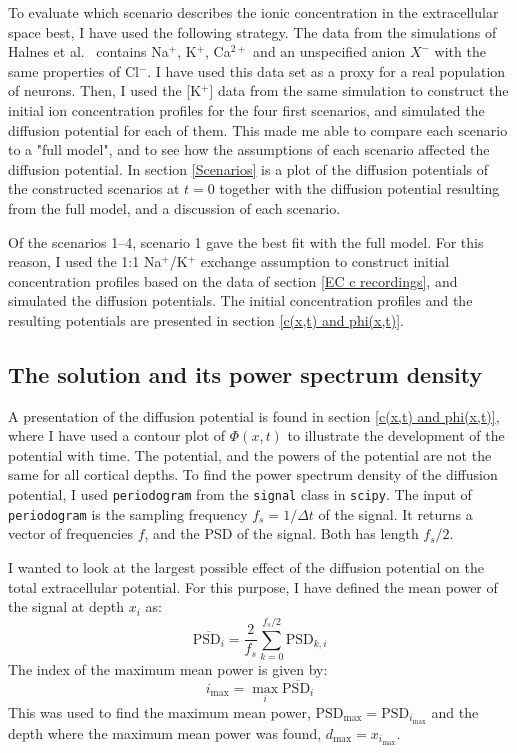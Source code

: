 \documentclass{article}
\begin{document}
To evaluate which scenario describes the ionic concentration in the extracellular space best, I have used the following strategy. 
The data from the  simulations of Halnes et al.\ \cite{Halnes2016} contains Na$^+$, K$^+$, Ca$^{2+}$ and an unspecified anion $X^-$ with the same properties of Cl$^-$. I have used this data set as a proxy for a real population of neurons. Then, I used the [K$^+$] data from the same simulation to construct the initial ion concentration profiles for the four first scenarios, and simulated the diffusion potential for each of them. This made me able to compare each scenario to a "full model", and to see how the assumptions of each scenario affected the diffusion potential. In section \ref{Scenarios} is a plot of the diffusion potentials of the constructed scenarios at $t=0$ together with the diffusion potential resulting from the full model, and a discussion of each scenario. 

Of the scenarios 1--4, scenario 1 gave the best fit with the full model. For this reason, I used the 1:1 Na$^+$/K$^+$ exchange assumption to construct initial concentration profiles based on the data of section \ref{EC c recordings}, and simulated the diffusion potentials. The  initial concentration profiles and the resulting potentials are presented in section \ref{c(x,t) and phi(x,t)}.

\subsection{The solution and its power spectrum density}\label{PSD of solution}
A presentation of the diffusion potential is found in section \ref{c(x,t) and phi(x,t)}, where I have used a contour plot of $\Phi(x,t)$ to illustrate the development of the potential with time. The potential, and the powers of the potential are not the same for all cortical depths.
To find the power spectrum density of the diffusion potential, I used \texttt{periodogram}  from the \texttt{signal} class in \texttt{scipy}. The input of \texttt{periodogram} is the sampling frequency $f_s = 1/\Delta t$ of the signal. It returns a vector of frequencies $f$, and the PSD of the signal. Both has length $f_s/2$. 

I wanted to look at the largest possible effect of the diffusion potential on the total extracellular potential. For this purpose, I have defined the mean power of the signal at depth $x_i$ as: 
 \begin{equation}
\overline{\text{PSD}_i} = \frac{2}{f_s} \sum_{k=0}^{f_s/2} \text{PSD}_{k,i}
 \end{equation}
The index of the maximum mean power is given by:
\begin{equation}
i_{\text{max}} = \max_i \overline{\text{PSD}_i}
\end{equation}
This was used to find the maximum mean power, $\text{PSD}_{\text{max}} = \text{PSD}_{i_{\text{max}}}$ and the depth where the maximum mean power was found, $d_{\text{max}} = x_{i_{\text{max}}}$.
\end{document}
